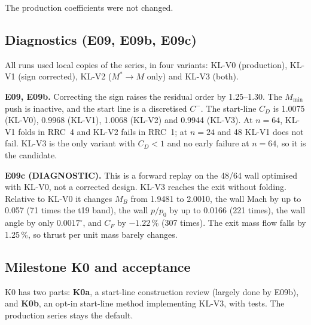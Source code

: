 The production coefficients were not changed.

\subsection{Diagnostics (E09, E09b, E09c)}
All runs used local copies of the series, in four variants: KL-V0 (production),
KL-V1 (sign corrected), KL-V2 ($M^*\to M$ only) and KL-V3 (both).

\textbf{E09, E09b.} Correcting the sign raises the residual order by 1.25--1.30. The
$M_{\min}$ push is inactive, and the start line is a discretised $C^-$. The start-line
$C_D$ is 1.0075 (KL-V0), 0.9968 (KL-V1), 1.0068 (KL-V2) and 0.9944 (KL-V3). At
$n=64$, KL-V1 folds in RRC~4 and KL-V2 fails in RRC~1; at $n=24$ and 48 KL-V1 does not
fail. KL-V3 is the only variant with $C_D<1$ and no early failure at $n=64$, so it is
the candidate.

\textbf{E09c (DIAGNOSTIC).} This is a forward replay on the 48/64 wall optimised with
KL-V0, not a corrected design. KL-V3 reaches the exit without folding. Relative to KL-V0 it changes $M_B$ from 1.9481
to 2.0010, the wall Mach by up to 0.057 (71 times the t19 band), the wall $p/p_0$ by up
to 0.0166 (221 times), the wall angle by only $0.0017^\circ$, and $C_F$ by $-1.22$\,\%
(307 times). The exit mass flow falls by 1.25\,\%, so thrust per unit mass barely changes.


\subsection{Milestone K0 and acceptance}
K0 has two parts: \textbf{K0a}, a start-line construction review (largely done by
E09b), and \textbf{K0b}, an opt-in start-line method implementing KL-V3, with tests. The
production series stays the default.
\begingroup\footnotesize
\par{}\addvspace{\LTpost}
\endgroup
